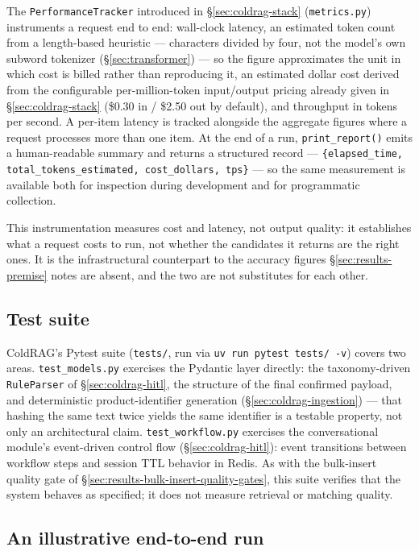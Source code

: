The \texttt{PerformanceTracker} introduced in \S\ref{sec:coldrag-stack} (\texttt{metrics.py}) instruments a request end to end: wall-clock latency, an estimated token count from a length-based heuristic — characters divided by four, not the model's own subword tokenizer (\S\ref{sec:transformer}) — so the figure approximates the unit in which cost is billed rather than reproducing it, an estimated dollar cost derived from the configurable per-million-token input/output pricing already given in \S\ref{sec:coldrag-stack} (\$0.30 in / \$2.50 out by default), and throughput in tokens per second. A per-item latency is tracked alongside the aggregate figures where a request processes more than one item. At the end of a run, \texttt{print\_report()} emits a human-readable summary and returns a structured record — \texttt{\{elapsed\_time, total\_tokens\_estimated, cost\_dollars, tps\}} — so the same measurement is available both for inspection during development and for programmatic collection.

This instrumentation measures cost and latency, not output quality: it establishes what a request costs to run, not whether the candidates it returns are the right ones. It is the infrastructural counterpart to the accuracy figures \S\ref{sec:results-premise} notes are absent, and the two are not substitutes for each other.

\subsection{Test suite}
\label{sec:results-coldrag-tests}

ColdRAG's Pytest suite (\texttt{tests/}, run via \texttt{uv run pytest tests/ -v}) covers two areas. \texttt{test\_models.py} exercises the Pydantic layer directly: the taxonomy-driven \texttt{RuleParser} of \S\ref{sec:coldrag-hitl}, the structure of the final confirmed payload, and deterministic product-identifier generation (\S\ref{sec:coldrag-ingestion}) — that hashing the same text twice yields the same identifier is a testable property, not only an architectural claim. \texttt{test\_workflow.py} exercises the conversational module's event-driven control flow (\S\ref{sec:coldrag-hitl}): event transitions between workflow steps and session TTL behavior in Redis. As with the bulk-insert quality gate of \S\ref{sec:results-bulk-insert-quality-gates}, this suite verifies that the system behaves as specified; it does not measure retrieval or matching quality.

\subsection{An illustrative end-to-end run}
\label{sec:results-coldrag-run}

